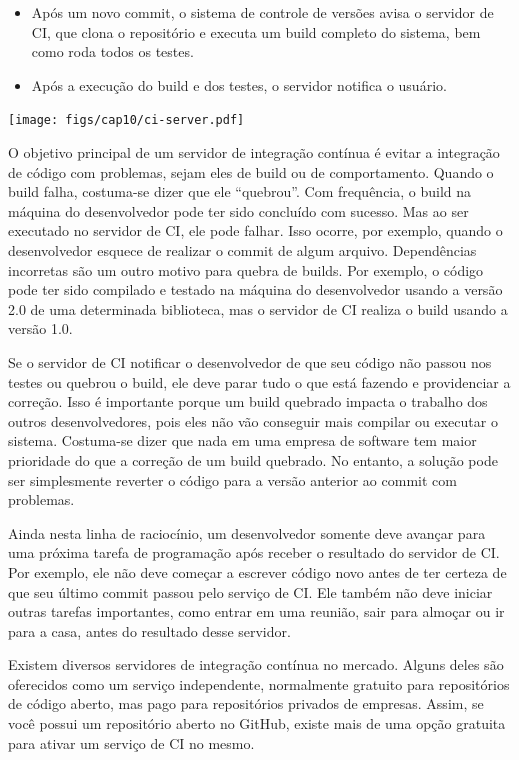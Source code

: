 \documentclass[
  11pt,
  twoside]{book}
\let\origfigure\figure
\let\endorigfigure\endfigure
\renewenvironment{figure}[1][2] {
    \expandafter\origfigure\expandafter[!h]
} {
    \endorigfigure
}
\begin{document}
\begin{itemize}
\item
  Após um novo commit, o sistema de controle de versões avisa o servidor
  de CI, que clona o repositório e executa um build completo do sistema,
  bem como roda todos os testes.
\item
  Após a execução do build e dos testes, o servidor notifica o usuário.
\end{itemize}

\begin{figure}
\centering
\texttt{[image: figs/cap10/ci-server.pdf]}
\caption{Servidor de Integração Contínua}
\end{figure}

O objetivo principal de um servidor de integração contínua é evitar a
integração de código com problemas, sejam eles de build ou de
comportamento. Quando o build falha, costuma-se dizer que ele
``quebrou''. Com frequência, o build na máquina do desenvolvedor pode
ter sido concluído com sucesso. Mas ao ser executado no servidor de CI,
ele pode falhar. Isso ocorre, por exemplo, quando o desenvolvedor
esquece de realizar o commit de algum arquivo. Dependências incorretas
são um outro motivo para quebra de builds. Por exemplo, o código pode
ter sido compilado e testado na máquina do desenvolvedor usando a versão
2.0 de uma determinada biblioteca, mas o servidor de CI realiza o build
usando a versão 1.0.

Se o servidor de CI notificar o desenvolvedor de que seu código não
passou nos testes ou quebrou o build, ele deve parar tudo o que está
fazendo e providenciar a correção. Isso é importante porque um build
quebrado impacta o trabalho dos outros desenvolvedores, pois eles não
vão conseguir mais compilar ou executar o sistema. Costuma-se dizer que
nada em uma empresa de software tem maior prioridade do que a correção
de um build quebrado. No entanto, a solução pode ser simplesmente
reverter o código para a versão anterior ao commit com problemas.

Ainda nesta linha de raciocínio, um desenvolvedor somente deve avançar
para uma próxima tarefa de programação após receber o resultado do
servidor de CI. Por exemplo, ele não deve começar a escrever código novo
antes de ter certeza de que seu último commit passou pelo serviço de CI.
Ele também não deve iniciar outras tarefas importantes, como entrar em
uma reunião, sair para almoçar ou ir para a casa, antes do resultado
desse servidor.

Existem diversos servidores de integração contínua no mercado. Alguns
deles são oferecidos como um serviço independente, normalmente gratuito
para repositórios de código aberto, mas pago para repositórios privados
de empresas. Assim, se você possui um repositório aberto no GitHub,
existe mais de uma opção gratuita para ativar um serviço de CI no mesmo.
\end{document}
